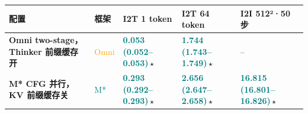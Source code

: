 \begin{tabularx}{\textwidth}{>{\bfseries}p{5.9cm} p{0.9cm} Y Y Y}
\toprule
{}
配置 & 框架 & I2T 1 token & I2T 64 token & I2I 512²·50 步 \\
\midrule
Omni two-stage，Thinker 前缀缓存开 & \textcolor{Orange}{Omni} & \textbf{\textcolor{Teal}{0.053\,\textcolor{Muted}{(0.052--0.053)}}}\,$\star$ & \textbf{\textcolor{Teal}{1.744\,\textcolor{Muted}{(1.743--1.749)}}}\,$\star$ & -- \\
M* CFG 并行，KV 前缀缓存关 & \textcolor{Teal}{M*} & \textbf{\textcolor{Teal}{0.293\,\textcolor{Muted}{(0.292--0.293)}}}\,$\star$ & \textbf{\textcolor{Teal}{2.656\,\textcolor{Muted}{(2.647--2.658)}}}\,$\star$ & \textbf{\textcolor{Teal}{16.815\,\textcolor{Muted}{(16.801--16.826)}}}\,$\star$ \\
\bottomrule
\end{tabularx}

